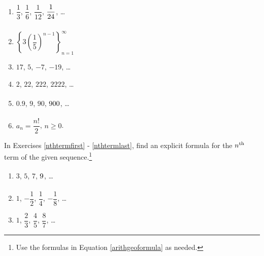 \documentclass{ximera}
\begin{document}
\begin{multicols}{2}
\begin{enumerate}
\setcounter{enumi}{\value{HW}}


\item  $\dfrac{1}{3}$, $\dfrac{1}{6}$, $\dfrac{1}{12}$, $\dfrac{1}{24} \vphantom{\left\{ 3 \left(\dfrac{1}{5}\right)^{n-1} \right\}_{n=1}^{\infty}}$, \ldots

\item  $\left\{ 3 \left(\dfrac{1}{5}\right)^{n-1} \right\}_{n=1}^{\infty}$


\item  $17$, $5$, $-7$, $-19$, \ldots

\item  $2$, $22$, $222$, $2222$, \ldots

\item  $0.9$, $9$, $90$, $900 \vphantom{a_{n} = \dfrac{n!}{2}}$, \ldots

\item  $a_{n} = \dfrac{n!}{2}$, $n \geq 0$.  \label{alggeoneithlast}


\setcounter{HW}{\value{enumi}}
\end{enumerate}
\end{multicols}


In Exercises \ref{nthtermfirst} - \ref{nthtermlast}, find an explicit formula for the $n^{\mbox{\scriptsize th}}$ term of the given sequence.\footnote{Use the formulas in Equation \ref{arithgeoformula} as needed.}

\begin{multicols}{3}
\begin{enumerate}
\setcounter{enumi}{\value{HW}}

\item $3$, $5$, $7$, $9 \vphantom{-\dfrac{1}{8}}$, \ldots \label{nthtermfirst}
\item $1$, $-\dfrac{1}{2}$, $\dfrac{1}{4}$, $-\dfrac{1}{8}$, \ldots
\item $1$, $\dfrac{2}{3}$, $\dfrac{4}{5}$, $\dfrac{8}{7}$, \ldots

\setcounter{HW}{\value{enumi}}
\end{enumerate}
\end{multicols}
\end{document}
